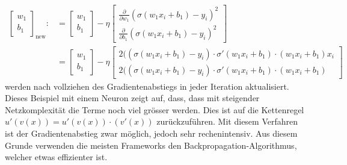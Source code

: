 \begin{equation}
\begin{split}
\begin{bmatrix}w_{1}\\b_{1}\end{bmatrix}_{\text{new}}:&={\begin{bmatrix}w_{1}\\b_{1}\end{bmatrix}}-\eta {\begin{bmatrix}
{\frac {\partial }{\partial w_{1}}}(\sigma(w_{1}x_{i}+b_{1})-y_{i})^{2}\\
{\frac {\partial }{\partial b_{1}}}(\sigma(w_{1}x_{i}+b_{1})-y_{i})^{2}\end{bmatrix}} \\ & =
{\begin{bmatrix}w_{1}\\b_{1}\end{bmatrix}}-\eta {\begin{bmatrix}2((\sigma(w_{1}x_{i}+b_{1}) - y_i) \cdot \sigma'(w_{1}x_{i}+b_{1}) \cdot (w_{1}x_{i}+b_{1}) x_{i} \\2((\sigma(w_{1}x_{i}+b_{1}) - y_i) \cdot \sigma'(w_{1}x_{i}+b_{1}) \cdot (w_{1}x_{i}+b_{1}) \end{bmatrix}}
\end{split}
\end{equation}
werden nach vollziehen des Gradientenabstiegs in jeder Iteration aktualisiert.
Dieses Beispiel mit einem Neuron zeigt auf, dass, dass mit steigender Netzkomplexität die Terme noch viel grösser werden. Dies ist auf die Kettenregel $u'(v(x)) = u'(v(x)) \cdot (v'(x))$ zurückzuführen. Mit diesem Verfahren ist der Gradientenabstieg zwar möglich, jedoch sehr rechenintensiv. Aus diesem Grunde verwenden die meisten Frameworks den Backpropagation-Algorithmus, welcher etwas effizienter ist.